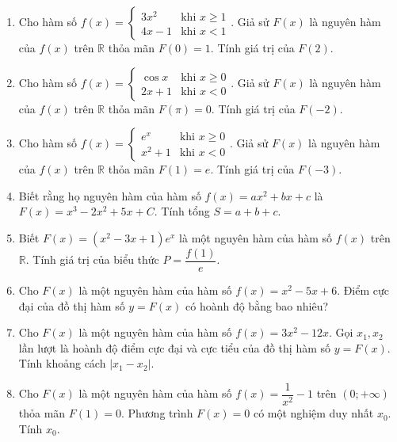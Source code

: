 \documentclass[12pt]{article}
\begin{document}
\begin{enumerate}[label=\textbf{Câu \arabic*.}, start=1]
		
		\item Cho hàm số $f(x) = \begin{cases} 3x^2 & \text{khi } x \ge 1 \\ 4x - 1 & \text{khi } x < 1 \end{cases}$. Giả sử $F(x)$ là nguyên hàm của $f(x)$ trên $\mathbb{R}$ thỏa mãn $F(0) = 1$. Tính giá trị của $F(2)$.
		
		
		\item Cho hàm số $f(x) = \begin{cases} \cos x & \text{khi } x \ge 0 \\ 2x + 1 & \text{khi } x < 0 \end{cases}$. Giả sử $F(x)$ là nguyên hàm của $f(x)$ trên $\mathbb{R}$ thỏa mãn $F(\pi) = 0$. Tính giá trị của $F(-2)$.
		
		
		\item Cho hàm số $f(x) = \begin{cases} e^x & \text{khi } x \ge 0 \\ x^2 + 1 & \text{khi } x < 0 \end{cases}$. Giả sử $F(x)$ là nguyên hàm của $f(x)$ trên $\mathbb{R}$ thỏa mãn $F(1) = e$. Tính giá trị của $F(-3)$.
		
		
		\item Biết rằng họ nguyên hàm của hàm số $f(x) = ax^2 + bx + c$ là $F(x) = x^3 - 2x^2 + 5x + C$. Tính tổng $S = a + b + c$.
		
		
		\item Biết $F(x) = (x^2 - 3x + 1)e^x$ là một nguyên hàm của hàm số $f(x)$ trên $\mathbb{R}$. Tính giá trị của biểu thức $P = \dfrac{f(1)}{e}$.
		
		
		\item Cho $F(x)$ là một nguyên hàm của hàm số $f(x) = x^2 - 5x + 6$. Điểm cực đại của đồ thị hàm số $y = F(x)$ có hoành độ bằng bao nhiêu?
		
		
		\item Cho $F(x)$ là một nguyên hàm của hàm số $f(x) = 3x^2 - 12x$. Gọi $x_1, x_2$ lần lượt là hoành độ điểm cực đại và cực tiểu của đồ thị hàm số $y = F(x)$. Tính khoảng cách $|x_1 - x_2|$.
		
		
		\item Cho $F(x)$ là một nguyên hàm của hàm số $f(x) = \dfrac{1}{x^2} - 1$ trên $(0; +\infty)$ thỏa mãn $F(1) = 0$. Phương trình $F(x) = 0$ có một nghiệm duy nhất $x_0$. Tính $x_0$.
		

\end{enumerate}
\end{document}
